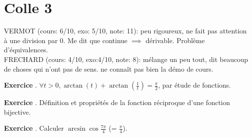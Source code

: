 \documentclass[10pt,a4paper]{article}
\newcounter{question}
\newcounter{exo}
\newenvironment{exo}{\vspace{0.5cm}\setcounter{question}{0}\addtocounter{exo}{1} \noindent \textbf{Exercice \theexo}. \normalsize }{\par}
\begin{document}
	\section*{Colle 3}
	\setcounter{exo}{0}
	VERMOT (cours: 6/10, exo: 5/10, note: 11): peu rigoureux, ne fait pas attention à une division par 0. Me dit que continue $\implies$ dérivable. Problème d'équivalences.\\
	FRECHARD (cours: 4/10, exo:4/10, note: 8): mélange un peu tout, dit beaucoup de choses qui n'ont pas de sens. ne connaît pas bien la démo de cours.
	
	\begin{exo}
		$\forall t > 0, \arctan(t)+ \arctan(\frac{1}{t}) = \frac{\pi}{2}$, par étude de fonctions.
	\end{exo}

	\begin{exo}
		Définition et propriétés de la fonction réciproque d'une fonction bijective.
	\end{exo}

	\begin{exo}
		Calculer $\arcsin \cos \frac{7 \pi}{4}$ (= $\frac{\pi}{4}$).
	\end{exo}
	
\end{document}
